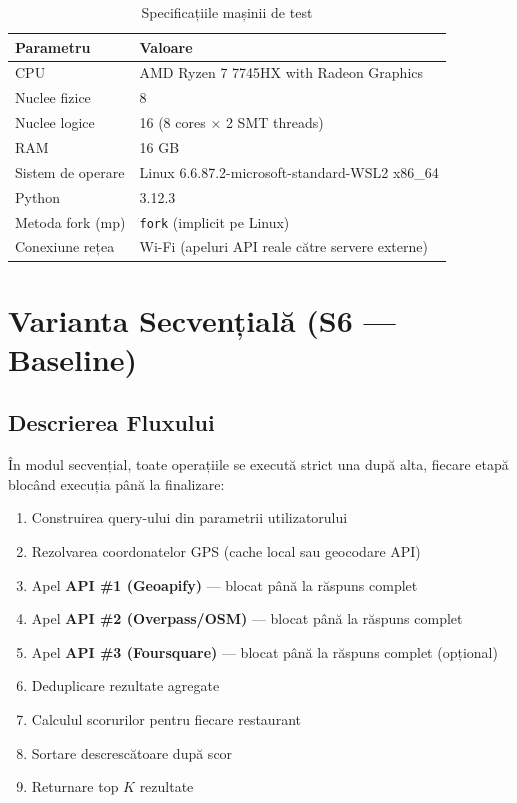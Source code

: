\documentclass[12pt,a4paper]{article}
\newcommand{\thead}[1]{\cellcolor{tblh}\color{white}\textbf{#1}}
\begin{document}
\begin{table}[H]
\centering
\begin{tabular}{ll}
\toprule
\thead{Parametru} & \thead{Valoare} \\
\midrule
CPU                 & AMD Ryzen 7 7745HX with Radeon Graphics \\
Nuclee fizice       & 8 \\
Nuclee logice       & 16 (8 cores $\times$ 2 SMT threads) \\
RAM                 & 16 GB \\
Sistem de operare   & Linux 6.6.87.2-microsoft-standard-WSL2 x86\_64 \\
Python              & 3.12.3 \\
Metoda fork (mp)    & \texttt{fork} (implicit pe Linux) \\
Conexiune rețea     & Wi-Fi (apeluri API reale către servere externe) \\
\bottomrule
\end{tabular}
\caption{Specificațiile mașinii de test}
\label{tab:machine}
\end{table}

\section{Varianta Secvențială (S6 --- Baseline)}

\subsection{Descrierea Fluxului}

În modul secvențial, toate operațiile se execută strict una după alta, fiecare etapă blocând execuția până la finalizare:

\begin{enumerate}[noitemsep]
  \item Construirea query-ului din parametrii utilizatorului
  \item Rezolvarea coordonatelor GPS (cache local sau geocodare API)
  \item Apel \textbf{API \#1 (Geoapify)} --- blocat până la răspuns complet
  \item Apel \textbf{API \#2 (Overpass/OSM)} --- blocat până la răspuns complet
  \item Apel \textbf{API \#3 (Foursquare)} --- blocat până la răspuns complet (opțional)
  \item Deduplicare rezultate agregate
  \item Calculul scorurilor pentru fiecare restaurant
  \item Sortare descrescătoare după scor
  \item Returnare top $K$ rezultate
\end{enumerate}
\end{document}
